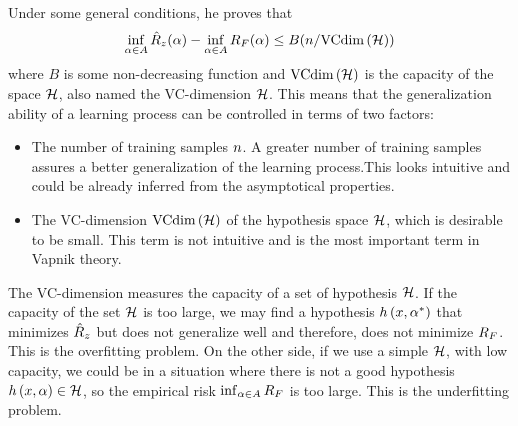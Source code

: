 Under some general conditions, he proves that
\begin{equation}\label{eq:ordinary_generalization_bound}
    \inf_{\param \in \paramspace} \emprisk(\param) - \inf_{\param \in \paramspace} \exprisk(\param) \leq B(\nsamples/\vcdim{\hypspace})
\end{equation}
where $B$ is some non-decreasing function and $\text{VCdim}\left(\mathcal{H}\right)$ is the capacity of the space $\mathcal{H}$, also named the VC-dimension $\mathcal{H}$. This means that the generalization ability of a learning process can be controlled in terms of two factors:
\begin{itemize}
    \item The number of training samples $n$. A greater number of training samples assures a better generalization of the learning process.This looks intuitive and could be already inferred from the asymptotical properties. 
    \item The VC-dimension $\text{VCdim}\left(\mathcal{H}\right)$ of the hypothesis space $\mathcal{H}$, which is desirable to be small. This term is not intuitive and is the most important term in Vapnik theory.
\end{itemize}
The VC-dimension measures the capacity of a set of hypothesis $\mathcal{H}$. 
If the capacity of the set $\mathcal{H}$ is too large, we may find a
hypothesis $h\left(x, {\alpha}^*\right)$ that minimizes $\hat{R}_z$ but does not 
generalize well and therefore, does not minimize $R_F$. This is the 
overfitting problem. 
On the other side, if we use a simple $\mathcal{H}$, 
with low capacity, we could be in a situation where there is not a good hypothesis $h\left(x, \alpha\right) \in \mathcal{H}$, so the empirical risk $\inf_{\alpha \in A} R_F$ is too large. This is the underfitting problem.


